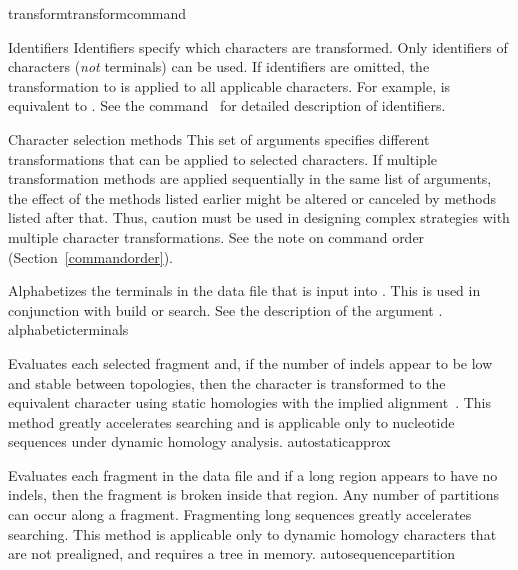 \begin{command}{transform}{transformcommand}
	\begin{arguments}
	
        \begin{argumentgroup}{Identifiers}
            Identifiers specify which characters are transformed. Only
            identifiers of characters (\emph{not} terminals) can be used. If
            identifiers are omitted, the transformation to is applied to all
            applicable characters. For example,
             is equivalent to
            . See the command~
            for detailed description of identifiers.
        \end{argumentgroup}
           
        \begin{argumentgroup}{Character selection methods}
            This set of arguments specifies different transformations that can be applied
            to selected characters. If multiple transformation methods are applied
            sequentially in the same list of arguments, the effect of the methods listed
            earlier might be altered or canceled by methods listed after that. Thus, caution
            must be used in designing complex strategies with multiple character
            transformations. See the note on command order (Section~\ref{commandorder}).

        {Alphabetizes the terminals in the data file that is input into \poy.  This is used in 
        conjunction with build or search. See the description of the argument 
        .}
        {alphabeticterminals}
        
            {Evaluates each selected fragment and, if the number of indels
            appear to be low and stable between topologies, then the character
            is transformed to the equivalent character using static homologies
            with the implied alignment~\cite{wheeler2003}.
            This method greatly accelerates searching and is applicable only to 
            nucleotide sequences under dynamic homology analysis.}
            {autostaticapprox}

            {Evaluates each fragment in the data file and if a long region appears 
            to have no indels, then the fragment is broken inside that region.
            Any number of partitions can occur along a fragment. Fragmenting
            long sequences greatly accelerates searching. This method is
            applicable only to dynamic homology characters that are not prealigned, 
            and requires a tree in memory.}
            {autosequencepartition}
            

\end{argumentgroup}
\end{arguments}
\end{command}

